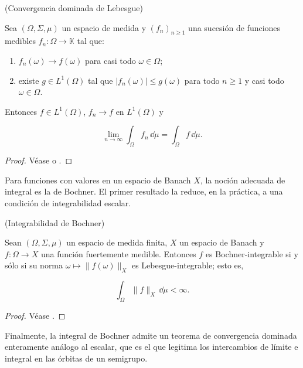 \begin{Teorema}{(Convergencia dominada de Lebesgue)}
\label{ch:preliminares:th:dominada}

Sea $(\Omega, \Sigma, \mu)$ un espacio de medida y $(f_n)_{n \geq 1}$ una sucesión
de funciones medibles $f_n : \Omega \rightarrow \mathbb{K}$ tal que:

\begin{enumerate}
    \item $f_n(\omega) \rightarrow f(\omega)$ para casi todo $\omega \in \Omega$;
    \item existe $g \in L^1(\Omega)$ tal que $|f_n(\omega)| \leq g(\omega)$ para
    todo $n \geq 1$ y casi todo $\omega \in \Omega$.
\end{enumerate}

Entonces $f \in L^1(\Omega)$, $f_n \rightarrow f$ en $L^1(\Omega)$ y

\[\lim_{n \rightarrow \infty} \int_\Omega f_n \, \dd \mu = \int_\Omega f \, \dd \mu.\]
\end{Teorema}

\begin{proof}
Véase \cite[Teorema~4.2]{brezis-2011-fun-ana-sob} o
\cite[Theorem~2.24]{folland_1999_real}.
\end{proof}

Para funciones con valores en un espacio de Banach $X$, la noción adecuada de
integral es la de Bochner. El primer resultado la reduce, en la práctica, a una
condición de integrabilidad escalar.\\

\begin{Teorema}{(Integrabilidad de Bochner)}
\label{ch:preliminares:th:bochner}

Sean $(\Omega, \Sigma, \mu)$ un espacio de medida finita, $X$ un espacio de
Banach y $f : \Omega \rightarrow X$ una función fuertemente medible. Entonces $f$
es Bochner-integrable si y sólo si su norma
$\omega \mapsto \lVert f(\omega) \rVert_X$ es Lebesgue-integrable; esto es,

\[\int_\Omega \lVert f \rVert_X \, \dd \mu < \infty.\]
\end{Teorema}

\begin{proof}
Véase \cite[Cap.~V, \S 5, Teorema~1]{yosida-1980-fun-ana}.
\end{proof}

Finalmente, la integral de Bochner admite un teorema de convergencia dominada
enteramente análogo al escalar, que es el que legitima los intercambios de
límite e integral en las órbitas de un semigrupo.\\

